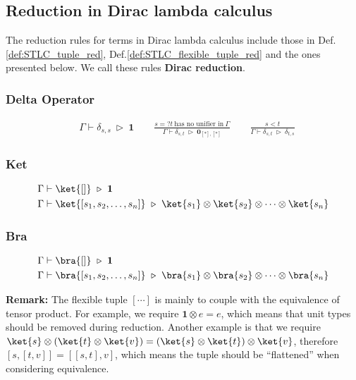 \subsection{Reduction in Dirac lambda calculus}
The reduction rules for terms in Dirac lambda calculus include those in Def.\ref{def:STLC_tuple_red}, Def.\ref{def:STLC_flexible_tuple_red} and the ones presented below.
We call these rules \textbf{Dirac reduction}.


\subsubsection*{Delta Operator}
\begin{align*}
  & \Gamma \vdash \delta_{s, s}\ \triangleright\ \mathbf{1}
  \qquad
  \frac{s =? t\ \textrm{has no unifier in}\ \Gamma}{\Gamma \vdash \delta_{s, t} \ \triangleright\ \mathbf{0}_{[*], [*]}}
  \qquad
  \frac{s < t}{\Gamma \vdash \delta_{s, t} \ \triangleright\ \delta_{t, s}}
\end{align*}

\subsubsection*{Ket}
\begin{align*}
  & \Gamma \vdash \ket{[]} \ \triangleright\ \mathbf{1} \\
  & \Gamma \vdash \ket{[s_1, s_2, \dots, s_n]} \ \triangleright\ \ket{s_1} \otimes \ket{s_2} \otimes \cdots \otimes \ket{s_n}
\end{align*}

\subsubsection*{Bra}
\begin{align*}
  & \Gamma \vdash \bra{[]} \ \triangleright\ \mathbf{1} \\
  & \Gamma \vdash \bra{[s_1, s_2, \dots, s_n]} \ \triangleright\ \bra{s_1} \otimes \bra{s_2} \otimes \cdots \otimes \bra{s_n}
\end{align*}

\textbf{Remark: } The flexible tuple $[\cdots]$ is mainly to couple with the equivalence of tensor product. For example, we require $\mathbf{1} \otimes e = e$, which means that unit types should be removed during reduction. Another example is that we require $\ket{s} \otimes (\ket{t} \otimes \ket{v}) = (\ket{s} \otimes \ket{t}) \otimes \ket{v}$, therefore $[s, [t, v]] = [[s, t], v]$, which means the tuple should be ``flattened'' when considering equivalence.

